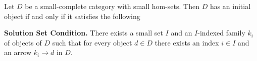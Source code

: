 Let $D$ be a small-complete category with small hom-sets. Then $D$ has an initial object if and only if it satisfies the following

\textbf{Solution Set Condition.} There exists a small set $I$ and an $I$-indexed family $k_i$ of objects of $D$ such that for every object $d \in D$ there exists an index $i \in I$ and an arrow $k_i \rightarrow d$ in $D$.
